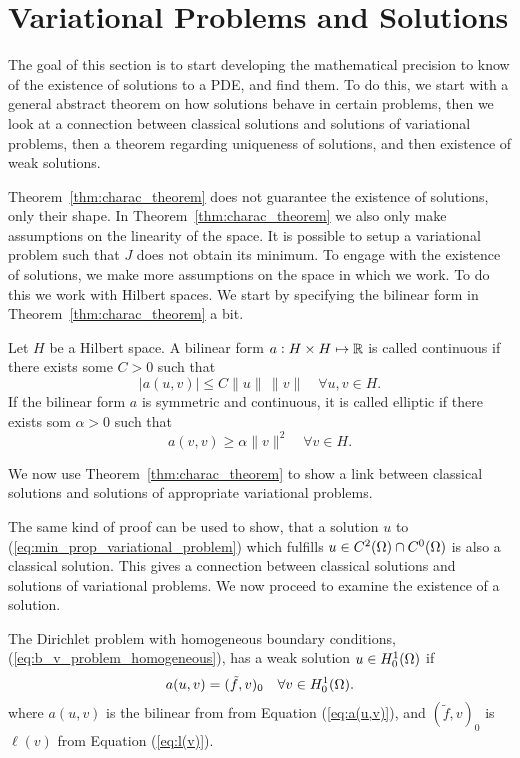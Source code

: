 \section{Variational Problems and Solutions}
The goal of this section is to start developing the mathematical 
precision to know of the existence of solutions to a PDE, and find 
them. 
To do this, we start with a general abstract theorem on how solutions 
behave in certain problems, then we look at a connection between 
classical solutions and solutions of variational problems, then a 
theorem regarding uniqueness of solutions, and then existence of 
weak solutions.


Theorem~\ref{thm:charac_theorem} does not guarantee the existence 
of solutions, only their shape. In Theorem~\ref{thm:charac_theorem} we 
also only make assumptions on the linearity of the space. 
It is possible to setup a variational problem such that $J$ does 
not obtain its minimum.
To engage with the existence of solutions, we make more assumptions on 
the space in which we work. To do this we work with Hilbert spaces. 
We start by specifying the bilinear form in Theorem~\ref{thm:charac_theorem} 
a bit.
\begin{defn}{\quad}
   Let $H$ be a Hilbert space. A bilinear form $a : H \times H \mapsto \mathbb{R}$ is 
   called continuous if there exists some $C > 0$ such that 
   \begin{equation}
    |a(u,v)| \leq C \|u\|\, \|v\| \quad \forall u,v \in H.
   \end{equation} 
   If the bilinear form $a$ is symmetric and continuous, it is called 
   elliptic if there exists som $\alpha >0$ such that 
   \begin{equation*}
    a(v,v) \geq \alpha \|v\|^2 \quad \forall v \in H.
   \end{equation*}
\end{defn}
We now use Theorem~\ref{thm:charac_theorem} to show a link between classical 
solutions and solutions of appropriate variational problems.

The same kind of proof can be used to show, that a solution $u$ to 
(\ref{eq:min_prop_variational_problem}) which fulfills 
$u\in C^2(\Omega) \cap C^0(\Omega)$ is also a classical solution. 
This gives a connection between classical solutions and solutions of 
variational problems. We now proceed to examine the existence of a 
solution.


\begin{defn}{\quad}
    The Dirichlet problem with homogeneous boundary conditions,
     (\ref{eq:b_v_problem_homogeneous}), has a weak solution $u\in H_0^1(\Omega)$
     if 
     \begin{equation*}
        a(u,v) = (\tilde{f},v)_0 \quad \forall v \in H_0^1(\Omega).
     \end{equation*}
     where $a(u,v)$ is the bilinear from from Equation (\ref{eq:a(u,v)}), 
     and $(\tilde{f},v)_0$ is $\ell(v)$ from Equation (\ref{eq:l(v)}).
\end{defn}


